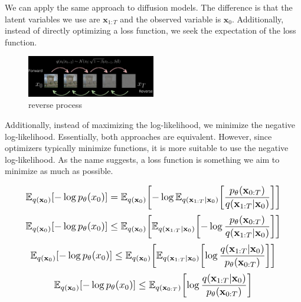 \documentclass{article}
\newcommand*{\Scale}[2][4]{\scalebox{#1}{\ensuremath{#2}}}
\begin{document}
We can apply the same approach to diffusion models. The difference is that the latent variables we use are $ \textbf{x}_{1:T} $  and the observed variable is $ \textbf{x}_0 $. Additionally, instead of directly optimizing a loss function, we seek the expectation of the loss function.
\begin{figure}[h]
    \centering
    \includegraphics[width=0.5\textwidth]{fig/reverse-process.png}
    \caption{reverse process}
    \label{fig:reverse_process}
\end{figure}

Additionally, instead of maximizing the log-likelihood, we minimize the negative log-likelihood. Essentially, both approaches are equivalent. However, since optimizers typically minimize functions, it is more suitable to use the negative log-likelihood. As the name suggests, a loss function is something we aim to minimize as much as possible.

\begin{equation}
\Scale[1.2]{ \displaystyle \mathbb{E}_{q(\mathbf{x}_0)} \left[ -\log p_\theta(x_0) \right] = 
\mathbb{E}_{q(\mathbf{x}_0)} \left[
-\log \mathbb{E}_{q(\textbf{x}_{1:T}|\textbf{x}_0)} \left[ \frac{p_\theta(\textbf{x}_{0:T})}{q(\textbf{x}_{1:T}|\textbf{x}_0)} \right] \right] }
\end{equation}
\begin{equation}
\Scale[1.2]{ \displaystyle \mathbb{E}_{q(\mathbf{x}_0)} \left[ -\log p_\theta(x_0) \right] \leq
\mathbb{E}_{q(\mathbf{x}_0)} \left[
\mathbb{E}_{q(\textbf{x}_{1:T}|\textbf{x}_0)} \left[ -\log \frac{p_\theta(\textbf{x}_{0:T})}{q(\textbf{x}_{1:T}|\textbf{x}_0)} \right] \right] }
\end{equation}
\begin{equation}
\Scale[1.2]{ \displaystyle \mathbb{E}_{q(\mathbf{x}_0)} \left[ -\log p_\theta(x_0) \right] \leq 
\mathbb{E}_{q(\mathbf{x}_0)} \left[
\mathbb{E}_{q(\textbf{x}_{1:T}|\textbf{x}_0)} \left[ \log \frac{q(\textbf{x}_{1:T}|\textbf{x}_0)}{p_\theta(\textbf{x}_{0:T})} \right] \right] }
\end{equation}
\begin{equation}
\Scale[1.2]{ \displaystyle \mathbb{E}_{q(\mathbf{x}_0)} \left[ -\log p_\theta(x_0) \right] \leq 
\mathbb{E}_{q(\textbf{x}_{0:T})} \left[ \log \frac{q(\textbf{x}_{1:T}|\textbf{x}_0)}{p_\theta(\textbf{x}_{0:T})} \right] }
\end{equation}
\end{document}
